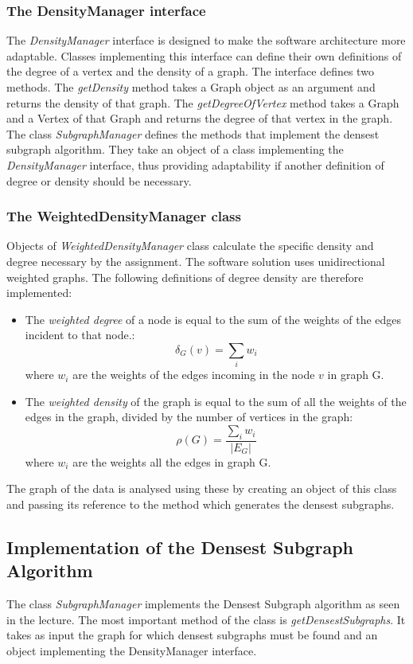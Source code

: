 \documentclass[10pt,a4paper]{article}
\begin{document}
\subsubsection{The DensityManager interface}
The \emph{DensityManager} interface is designed to make the software architecture more adaptable. Classes implementing this interface can define their own definitions of the degree of a vertex and the density of a graph. The interface defines two methods. The \emph{getDensity} method takes a Graph object as an argument and returns the density of that graph. The \emph{getDegreeOfVertex} method takes a Graph and a Vertex of that Graph and returns the degree of that vertex in the graph.\\
The class \emph{SubgraphManager} defines the methods that implement the densest subgraph algorithm. They take an object of a class implementing the \emph{DensityManager} interface, thus providing adaptability if another definition of degree or density should be necessary.
\subsubsection{The WeightedDensityManager class}
Objects of \emph{WeightedDensityManager} class calculate the specific density and degree necessary by the assignment. The software solution uses unidirectional weighted graphs. The following definitions of degree density are therefore implemented:
\begin{itemize}
	\item  The \emph{weighted degree} of a node is equal to the sum of the weights of the edges incident to that node.:
$$\delta_{G}(v)=\sum_i{w_{i}}$$
where $w_i$ are the weights of the edges incoming in the node $v$	in graph G. \item The \emph{weighted density} of the graph is equal to the sum of all the weights of the edges in the graph, divided by the number of vertices in the graph:
$$\rho(G)=\dfrac{\sum_i{w_{i}}}{\left|E_G\right|}$$
where $w_i$ are the weights all the edges in graph G. 	
\end{itemize}
The graph of the data is analysed using these by creating an object of this class and passing its reference to the method which generates the densest subgraphs.

\subsection{Implementation of the Densest Subgraph Algorithm}
The class \emph{SubgraphManager} implements the Densest Subgraph algorithm as seen in the lecture. The most important method of the class is \emph{getDensestSubgraphs}. It takes as input the graph for which densest subgraphs must be found and an object implementing the DensityManager interface.
\end{document}
